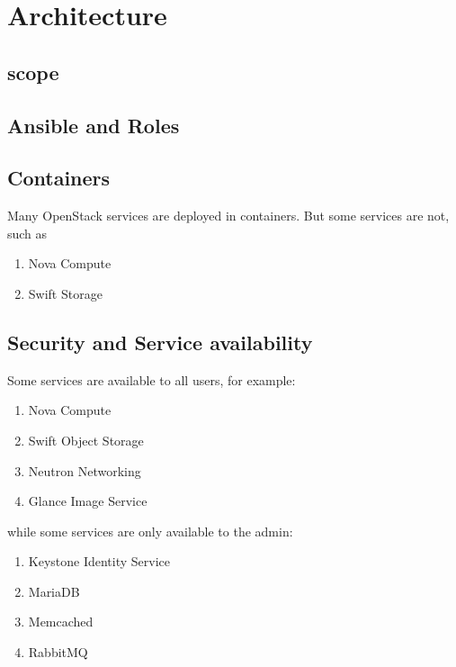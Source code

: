 \section{Architecture}

\subsection{scope}



\subsection{Ansible and Roles}




\subsection{Containers}

Many OpenStack services are deployed in containers. But some services are not, such as
\begin{enumerate}
\item Nova Compute
\item Swift Storage
\end{enumerate}

\subsection{Security and Service availability}

Some services are available to all users, for example:

\begin{enumerate}
\item Nova Compute
\item Swift Object Storage
\item Neutron Networking
\item Glance Image Service
\end{enumerate}

while some services are only available
to the admin:

\begin{enumerate}
\item Keystone Identity Service
\item MariaDB
\item Memcached
\item RabbitMQ
\end{enumerate}
